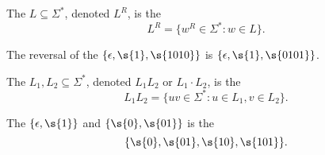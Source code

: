 \begin{flex}
\begin{solution}
\end{solution}
\end{flex}


\begin{flex}
\begin{definition} \label{definition:Reversal-of-a-language}
The  $L \subseteq \Sigma^*$, denoted $L^R$, is the 
\[
    L^R = \{w^R \in \Sigma^* : w \in L\}. 
\]
\end{definition}

\begin{example} \label{example:Reversal-of-epsilon-1-1010}
The reversal of the  $\{\epsilon, \s{1}, \s{1010}\}$ is $\{\epsilon, \s{1}, \s{0101}\}$.
\end{example}
\end{flex}


\begin{flex}
\begin{definition} \label{definition:Concatenation-of-languages}
The  $L_1, L_2 \subseteq \Sigma^*$, denoted $L_1L_2$ or $L_1 \cdot L_2$, is the 
\[
    L_1L_2 = \{uv \in \Sigma^* : u \in L_1, v \in L_2\}.
\]
\end{definition}

\begin{example} \label{example:Concatenation-of-epsilon-1-and-0-01}
The  $\{\epsilon, \s{1}\}$ and $\{\s{0}, \s{01}\}$ is the 
\[
    \{\s{0}, \s{01}, \s{10}, \s{101}\}.
\] 
\end{example}
\end{flex}


